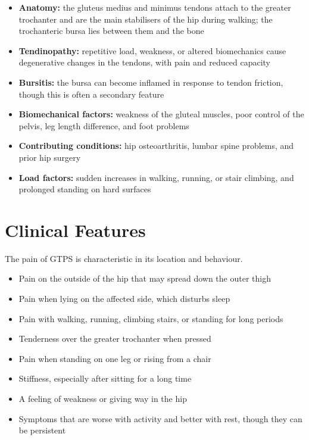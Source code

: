 \begin{itemize}
    \item \textbf{Anatomy:} the gluteus medius and minimus tendons attach to the greater trochanter and are the main stabilisers of the hip during walking; the trochanteric bursa lies between them and the bone
    \item \textbf{Tendinopathy:} repetitive load, weakness, or altered biomechanics cause degenerative changes in the tendons, with pain and reduced capacity
    \item \textbf{Bursitis:} the bursa can become inflamed in response to tendon friction, though this is often a secondary feature
    \item \textbf{Biomechanical factors:} weakness of the gluteal muscles, poor control of the pelvis, leg length difference, and foot problems
    \item \textbf{Contributing conditions:} hip osteoarthritis, lumbar spine problems, and prior hip surgery
    \item \textbf{Load factors:} sudden increases in walking, running, or stair climbing, and prolonged standing on hard surfaces
\end{itemize}

\section*{Clinical Features}
The pain of GTPS is characteristic in its location and behaviour.

\begin{itemize}
    \item Pain on the outside of the hip that may spread down the outer thigh
    \item Pain when lying on the affected side, which disturbs sleep
    \item Pain with walking, running, climbing stairs, or standing for long periods
    \item Tenderness over the greater trochanter when pressed
    \item Pain when standing on one leg or rising from a chair
    \item Stiffness, especially after sitting for a long time
    \item A feeling of weakness or giving way in the hip
    \item Symptoms that are worse with activity and better with rest, though they can be persistent
\end{itemize}

